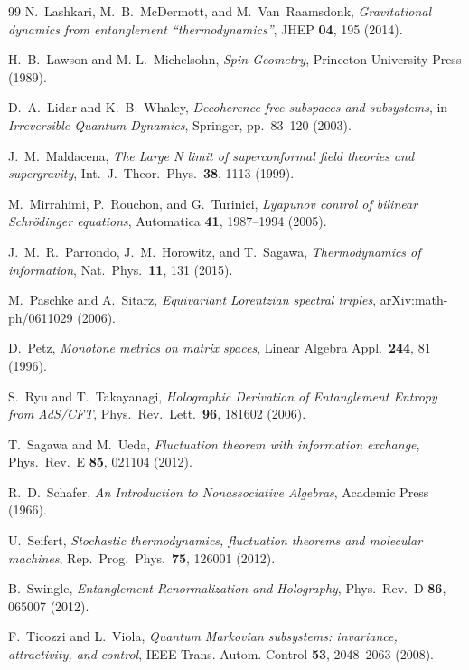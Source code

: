 \documentclass[12pt,a4paper,openany]{book}
\begin{document}
\begin{thebibliography}{99}
N.~Lashkari, M.~B.~McDermott, and M.~Van~Raamsdonk, \emph{Gravitational dynamics from entanglement ``thermodynamics''}, JHEP \textbf{04}, 195 (2014).

H.~B.~Lawson and M.-L.~Michelsohn,
\emph{Spin Geometry},
Princeton University Press (1989).

D.~A.~Lidar and K.~B.~Whaley, \emph{Decoherence-free subspaces and subsystems}, in \emph{Irreversible Quantum Dynamics}, Springer, pp.\ 83--120 (2003).

J.~M.~Maldacena, \emph{The Large N limit of superconformal field theories and supergravity}, Int.\ J.\ Theor.\ Phys.\ \textbf{38}, 1113 (1999).

M.~Mirrahimi, P.~Rouchon, and G.~Turinici, \emph{Lyapunov control of bilinear Schr\"odinger equations}, Automatica \textbf{41}, 1987--1994 (2005).

J.~M.~R.~Parrondo, J.~M.~Horowitz, and T.~Sagawa, \emph{Thermodynamics of information}, Nat.\ Phys.\ \textbf{11}, 131 (2015).

M.~Paschke and A.~Sitarz, \emph{Equivariant Lorentzian spectral triples}, arXiv:math-ph/0611029 (2006).

D.~Petz, \emph{Monotone metrics on matrix spaces}, Linear Algebra Appl.\ \textbf{244}, 81 (1996).

S.~Ryu and T.~Takayanagi, \emph{Holographic Derivation of Entanglement Entropy from AdS/CFT}, Phys.\ Rev.\ Lett.\ \textbf{96}, 181602 (2006).

T.~Sagawa and M.~Ueda, \emph{Fluctuation theorem with information exchange}, Phys.\ Rev.\ E \textbf{85}, 021104 (2012).

R.~D.~Schafer, \emph{An Introduction to Nonassociative Algebras}, Academic Press (1966).

U.~Seifert, \emph{Stochastic thermodynamics, fluctuation theorems and molecular machines}, Rep.\ Prog.\ Phys.\ \textbf{75}, 126001 (2012).

B.~Swingle, \emph{Entanglement Renormalization and Holography}, Phys.\ Rev.\ D \textbf{86}, 065007 (2012).

F.~Ticozzi and L.~Viola, \emph{Quantum Markovian subsystems: invariance, attractivity, and control}, IEEE Trans. Autom. Control \textbf{53}, 2048--2063 (2008).


\end{thebibliography}
\end{document}
